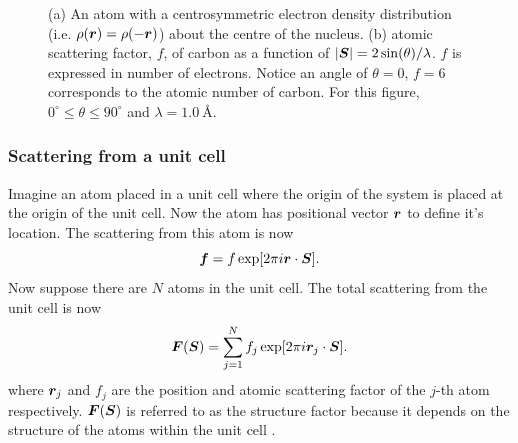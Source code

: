 \begin{figure}
\begin{subfigure}[b]{0.5\textwidth}
                        \caption{}
                        \label{fig:carbon atomic scattering factor}
                \end{subfigure}
                \caption{(a) An atom with a centrosymmetric electron density distribution (i.e. $\rho(\boldsymbol{r}) = \rho(-\boldsymbol{r})$) about the centre of the nucleus. (b) atomic scattering factor, $f$, of carbon as a function of $|\boldsymbol{S}| = 2 \sin(\theta)/\lambda$. $f$ is expressed in number of electrons. Notice an angle of $\theta = 0$, $f=6$ corresponds to the atomic number of carbon. For this figure, $0^{\circ} \leq \theta \leq 90^{\circ}$ and $\lambda = 1.0\ $\AA.}
        		\label{fig:Scattering from an atom}
            \end{figure}

        \subsubsection{Scattering from a unit cell}
        \label{subs:Scattering from a unit cell}
            Imagine an atom placed in a unit cell where the origin of the system is placed at the origin of the unit cell.
            Now the atom has positional vector $\boldsymbol{r}$ to define it's location.
            The scattering from this atom is now
            \begin{equation}
                \boldsymbol{f} = f \exp[2 \pi i \boldsymbol{r} \cdot \boldsymbol{S}].
            \end{equation}
            Now suppose there are $N$ atoms in the unit cell. The total scattering from the unit cell is now
            \begin{equation}
                \boldsymbol{F}(\boldsymbol{S}) = \sum_{j=1}^N f_j \exp[2 \pi i \boldsymbol{r}_j \cdot \boldsymbol{S}].
                \label{eq:structure factor equation - summation}
            \end{equation}
            where $\boldsymbol{r}_j$ and $f_j$ are the position and atomic scattering factor of the $j$-th atom respectively. $\boldsymbol{F}(\boldsymbol{S})$ is referred to as the structure factor because it depends on the structure of the atoms within the unit cell \cite{drenth2012}.

